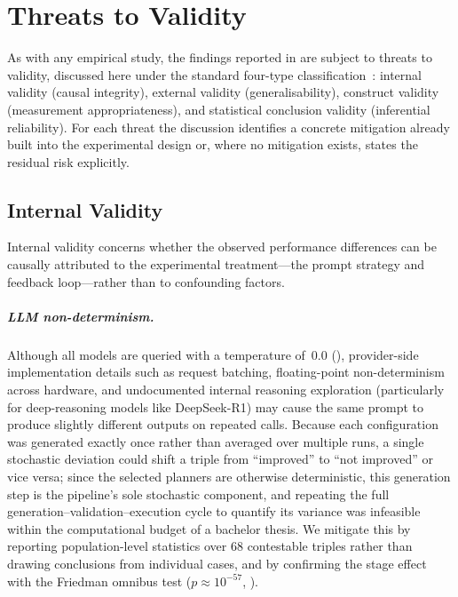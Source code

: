 \chapter{Threats to Validity}\label{ch:threats}

As with any empirical study, the findings reported in  are subject to threats to validity, discussed here under the standard four-type classification~\cite{Wohlin2012}: internal validity (causal integrity), external validity (generalisability), construct validity (measurement appropriateness), and statistical conclusion validity (inferential reliability).
For each threat the discussion identifies a concrete mitigation already built into the experimental design or, where no mitigation exists, states the residual risk explicitly.

\section{Internal Validity}
\label{sec:threats:internal}

Internal validity concerns whether the observed performance differences can be causally attributed to the experimental treatment---the prompt strategy and feedback loop---rather than to confounding factors.

\paragraph{LLM non-determinism.}
Although all models are queried with a temperature of~$0.0$ (), provider-side implementation details such as request batching, floating-point non-determinism across hardware, and undocumented internal reasoning exploration (particularly for deep-reasoning models like DeepSeek-R1) may cause the same prompt to produce slightly different outputs on repeated calls.
Because each configuration was generated exactly once rather than averaged over multiple runs, a single stochastic deviation could shift a triple from ``improved'' to ``not improved'' or vice versa; since the selected planners are otherwise deterministic, this generation step is the pipeline's sole stochastic component, and repeating the full generation--validation--execution cycle to quantify its variance was infeasible within the computational budget of a bachelor thesis.
We mitigate this by reporting population-level statistics over 68 contestable triples rather than drawing conclusions from individual cases, and by confirming the stage effect with the Friedman omnibus test ($p \approx 10^{-57}$, ).

